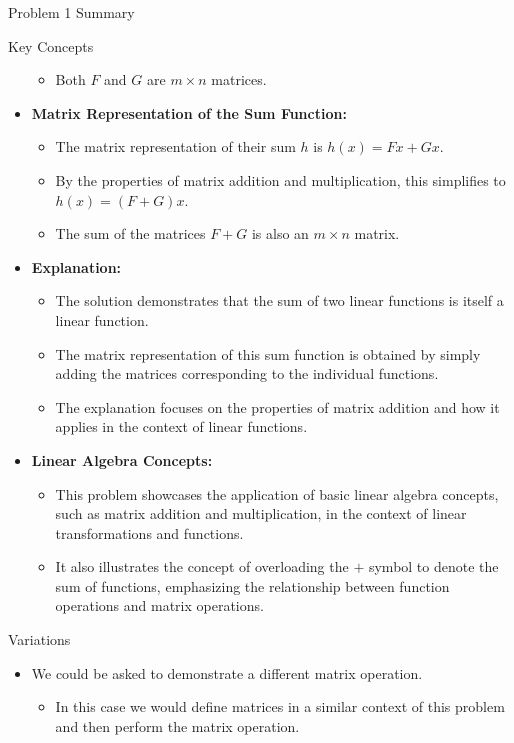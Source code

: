 \begin{summary}{Problem 1 Summary}
\begin{statement}{Key Concepts}
\begin{itemize}
\begin{itemize}
                \item Both $F$ and $G$ are $m \times n$ matrices.
            \end{itemize}
            \item \textbf{Matrix Representation of the Sum Function:}
            \begin{itemize}
                \item The matrix representation of their sum $h$ is $h(x) = Fx + Gx$.
                \item By the properties of matrix addition and multiplication, this simplifies to $h(x) = (F + G)x$.
                \item The sum of the matrices $F + G$ is also an $m \times n$ matrix.
            \end{itemize}
            \item \textbf{Explanation:}
            \begin{itemize}
                \item The solution demonstrates that the sum of two linear functions is itself a linear function.
                \item The matrix representation of this sum function is obtained by simply adding the matrices corresponding to the individual functions.
                \item The explanation focuses on the properties of matrix addition and how it applies in the context of linear functions.
            \end{itemize}
            \item \textbf{Linear Algebra Concepts:}
            \begin{itemize}
                \item This problem showcases the application of basic linear algebra concepts, such as matrix addition and multiplication, in the context of linear transformations and functions.
                \item It also illustrates the concept of overloading the $+$ symbol to denote the sum of functions, emphasizing the relationship between function operations and matrix operations.
            \end{itemize}
        \end{itemize}
    \end{statement}
    \begin{statement}{Variations}
        \begin{itemize}
            \item We could be asked to demonstrate a different matrix operation.
            \begin{itemize}
                \item In this case we would define matrices in a similar context of this problem and then perform the matrix operation.
            \end{itemize}
        \end{itemize}
    \end{statement}
\end{summary}

